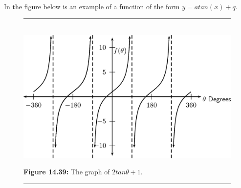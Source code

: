         
        \label{m39414*id90209}In the figure below is an example of a function of the form \begin{math}y=atan\left(x\right)+q\end{math}.\par 
        
    \setcounter{subfigure}{0}


	\begin{figure}[H] %
    \begin{center}
    \rule[.1in]{\figurerulewidth}{.005in} \\
        \label{m39414*uid73!!!underscore!!!media}\label{m39414*uid73!!!underscore!!!printimage}\includegraphics{col11306.imgs/m39414_MG10C15_045.png} %
        
      \vspace{2pt}
    \vspace{\rubberspace}\par \begin{cnxcaption}
	  \small \textbf{Figure 14.39: }The graph of \begin{math}2tan\theta +1\end{math}.
	\end{cnxcaption}
      
    \vspace{.1in}
    \rule[.1in]{\figurerulewidth}{.005in} \\
        
    \end{center}

 \end{figure}   

    \addtocounter{footnote}{-0}
    
\label{m39414*secfhsst!!!underscore!!!id3205}
